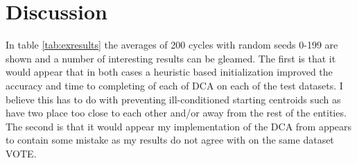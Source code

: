 \section{Discussion}

In table \ref{tab:exresults} the averages of 200 cycles with random seeds 0-199 are shown and a number of interesting results can be gleamed. The first is that it would appear that in both cases a heuristic based initialization improved the accuracy and time to completing of each of DCA on each of the test datasets. I believe this has to do with preventing ill-conditioned starting centroids such as have two place too close to each other and/or away from the rest of the entities. The second is that it would appear my implementation of the DCA from \cite{an_minimum_2009} appears to contain some mistake as my results do not agree with \cite{an_minimum_2009} on the same dataset VOTE. 